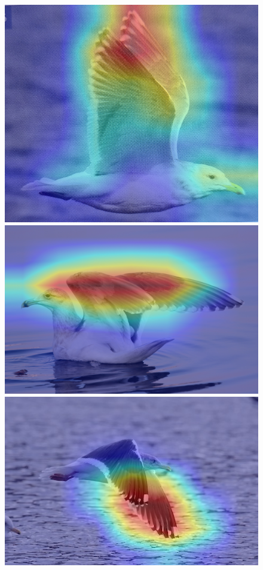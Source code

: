 \documentclass[a4paper,12pt]{report}
\begin{document}
\begin{figure}[htbp]
\begin{multicols}{6}
        \includegraphics[width=\linewidth]{images/interpretability/vgg/bird7.jpg}
        
        \includegraphics[width=\linewidth]{images/interpretability/vgg/bird8.jpg}
        
        \includegraphics[width=\linewidth]{images/interpretability/vgg/bird9.jpeg}
        

\end{multicols}
\end{figure}
\end{document}
